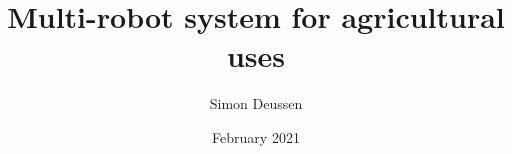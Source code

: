 \documentclass{report}
\title{Multi-robot system for agricultural uses}
\date{February 2021}
\author{Simon Deussen}
\begin{document}
\begin{titlepage}
    \maketitle
\end{titlepage}


\newpage
\tableofcontents
\newpage







\newpage


\end{document}
